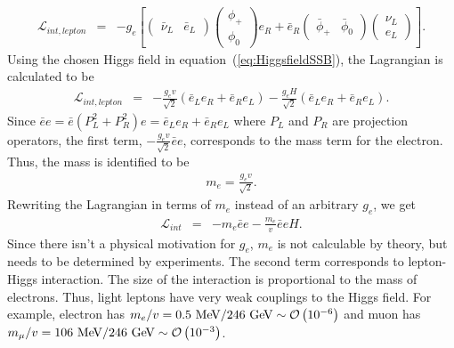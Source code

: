 \begin{eqnarray} 
\mathcal{L}_{int, lepton} 
&=& 
-g_e \left[ 
\left(  \begin{array}{cc} \bar{\nu}_L & \bar{e}_L \end{array} \right)
\left(  \begin{array}{c} \phi_+  \\ \phi_0 \end{array} \right) e_R
+ 
\bar{e}_R
\left(  \begin{array}{cc} \bar{\phi}_+  & \bar{\phi}_0 \end{array} \right) 
\left(  \begin{array}{c} \nu_L \\ e_L \end{array} \right)
\right].
\end{eqnarray} 
Using the chosen Higgs field in equation~(\ref{eq:HiggsfieldSSB}), 
the Lagrangian is calculated to be 
\begin{eqnarray} 
\mathcal{L}_{int, lepton} 
&=& 
-\frac{g_e v}{\sqrt{2}}\left( \bar{e}_L e_R + \bar{e}_R e_L \right)  
-\frac{g_e H}{\sqrt{2}}\left( \bar{e}_L e_R + \bar{e}_R e_L \right). 
\end{eqnarray}
Since $\bar{e}e = \bar{e}(P_L^2+P_R^2)e = \bar{e}_L e_R + \bar{e}_R e_L$ where
$P_L$ and $P_R$ are projection operators, the first term, 
$\displaystyle -\frac{g_e v}{\sqrt{2}} \bar{e}e$, corresponds to the mass term for the electron. 
Thus, the mass is identified to be 
\begin{eqnarray} 
m_e = \frac{g_e v}{\sqrt{2}}.
\end{eqnarray} 
Rewriting the Lagrangian in terms of $m_e$ instead of an arbitrary $g_e$, we get 
\begin{eqnarray} 
\mathcal{L}_{int} 
&=& 
- m_e \bar{e}e  -\frac{m_e}{v} \bar{e}e H. 
\end{eqnarray} 
Since there isn't a physical motivation for $g_e$, $m_e$ is not calculable 
by theory, but needs to be determined by experiments. The second term 
corresponds to lepton-Higgs interaction. The size of the interaction 
is proportional to the mass of electrons. Thus, light leptons have very 
weak couplings to the Higgs field. For example, electron has 
$m_e/v = 0.5~\mathrm{Me\kern -0.1em V}/246~\mathrm{Ge\kern -0.1em V} \sim \mathcal{O}\left(10^{-6}\right)$
and muon has $m_\mu / v = 106~\mathrm{Me\kern -0.1em V}/246~\mathrm{Ge\kern -0.1em V} \sim \mathcal{O}\left(10^{-3}\right)$.

